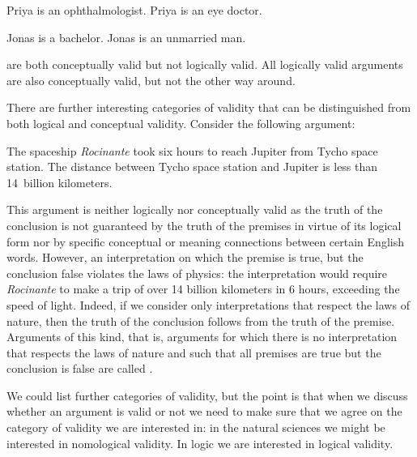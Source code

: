 \begin{earg}
		\prem Priya is an ophthalmologist.
		\conc Priya is an eye doctor.
	\end{earg}
	
	\begin{earg}
		\prem Jonas is a bachelor.
		\conc Jonas is an unmarried man.
	\end{earg}
	
	are both conceptually valid but not logically valid. All logically valid arguments are also conceptually valid, but not the other way around.
	
	There are further interesting categories of validity that can be distinguished from both logical and conceptual validity. Consider the following argument:
	\begin{earg}
		\prem The spaceship \emph{Rocinante} took six hours to reach Jupiter from Tycho space station.
		\conc The distance between Tycho space station and Jupiter is less than 14~billion kilometers.
	\end{earg}
This argument is neither logically nor conceptually valid as the truth of the conclusion is not guaranteed by the truth of the premises in virtue of its logical form nor by specific conceptual or meaning connections between certain English words. However, an interpretation on which the premise is true, but the conclusion false violates the laws of physics: the interpretation would require \emph{Rocinante} to make a trip of over 14 billion kilometers in 6 hours, exceeding the speed of light. Indeed, if we consider only interpretations that respect the laws of nature, then the truth of the conclusion follows from the truth of the premise. Arguments of this kind, that is, arguments for which there is no interpretation that respects the laws of nature and such that all premises are true but the conclusion is false are called .

We could list further categories of validity, but the point is that when we discuss whether an argument is valid or not we need to make sure that we agree on the category of validity we are interested in: in the natural sciences we might be interested in nomological validity. In logic we are interested in logical validity. 

